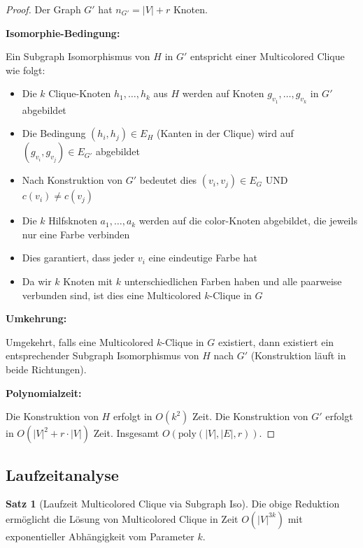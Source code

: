 ﻿\documentclass[a4paper,12pt]{article}
\theoremstyle{definition}
\newtheorem{satz}{Satz}[section]
\begin{document}
\begin{proof}
	Der Graph $G'$ hat $n_{G'} = |V| + r$ Knoten.
	
	\textbf{Isomorphie-Bedingung:}
	
	Ein Subgraph Isomorphismus von $H$ in $G'$ entspricht einer Multicolored Clique wie folgt:
	
	\begin{itemize}
		\item Die $k$ Clique-Knoten $h_1, \ldots, h_k$ aus $H$ werden auf Knoten $g_{v_1}, \ldots, g_{v_k}$ in $G'$ abgebildet
		\item Die Bedingung $(h_i, h_j) \in E_H$ (Kanten in der Clique) wird auf $(g_{v_i}, g_{v_j}) \in E_{G'}$ abgebildet
		\item Nach Konstruktion von $G'$ bedeutet dies $(v_i, v_j) \in E_G$ UND $c(v_i) \neq c(v_j)$
		\item Die $k$ Hilfsknoten $a_1, \ldots, a_k$ werden auf die $\text{color}$-Knoten abgebildet, die jeweils nur eine Farbe verbinden
		\item Dies garantiert, dass jeder $v_i$ eine eindeutige Farbe hat
		\item Da wir $k$ Knoten mit $k$ unterschiedlichen Farben haben und alle paarweise verbunden sind, ist dies eine Multicolored $k$-Clique in $G$
	\end{itemize}
	
	\textbf{Umkehrung:}
	
	Umgekehrt, falls eine Multicolored $k$-Clique in $G$ existiert, dann existiert ein entsprechender Subgraph Isomorphismus von $H$ nach $G'$ (Konstruktion läuft in beide Richtungen).
	
	\textbf{Polynomialzeit:}
	
	Die Konstruktion von $H$ erfolgt in $O(k^2)$ Zeit. Die Konstruktion von $G'$ erfolgt in $O(|V|^2 + r \cdot |V|)$ Zeit. Insgesamt $O(\text{poly}(|V|, |E|, r))$.
\end{proof}

\subsection{Laufzeitanalyse}

\begin{satz}[Laufzeit Multicolored Clique via Subgraph Iso]
	Die obige Reduktion ermöglicht die Lösung von Multicolored Clique in Zeit $O(|V|^{3k})$ mit exponentieller Abhängigkeit vom Parameter $k$.
\end{satz}
\end{document}
